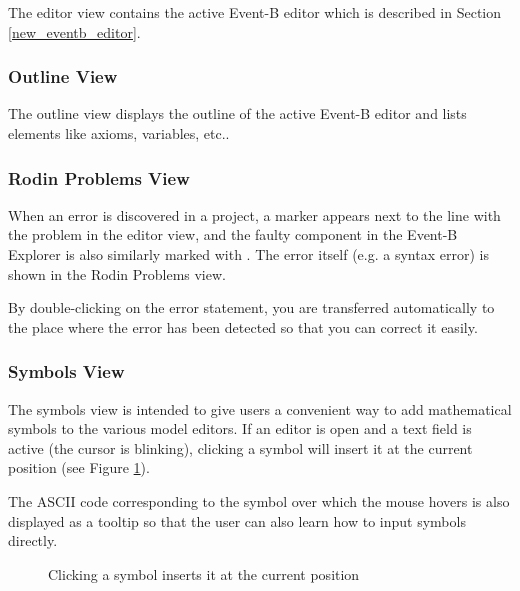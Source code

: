 The editor view contains the active Event-B editor which is described in Section \ref{new_eventb_editor}.

\subsubsection{Outline View}
\label{outline_view}

The outline view displays the outline of the active Event-B editor and lists elements like axioms, variables, etc.. 

\subsubsection{Rodin Problems View}
\label{rodin_problems_view}

When an error is discovered in a project, a  marker appears next to the line with the problem in the editor view, and the faulty component in the \textsf{Event-B Explorer} is also similarly marked with . The error itself (e.g. a syntax error) is shown in the Rodin Problems view.

By double-clicking on the error statement, you are transferred automatically to the place where the error has been detected so that you can correct it easily.

\subsubsection{Symbols View}
\label{symbols_view}

The symbols view is intended to give users a convenient way to add mathematical symbols to the various model editors. If an editor is open and a text field is active (the cursor is blinking), clicking a symbol will insert it at the current position (see Figure \ref{fig_ref_01_symbol_table1}). 

The ASCII code corresponding to the symbol over which the mouse hovers is also displayed as a tooltip so that the user can also learn how to input symbols directly. 

\begin{figure}[!ht]
\begin{center}
	\caption{Clicking a symbol inserts it at the current position}
	\label{fig_ref_01_symbol_table1}
\end{center}
\end{figure}

